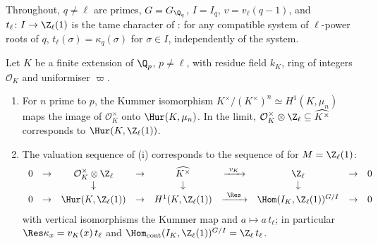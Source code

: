 Throughout, $q\ne\ell$ are primes, $G=G_{\Q_q}$, $I=I_q$, $v=v_\ell(q-1)$, and $t_\ell\colon I\to\Z_\ell(1)$ is the tame character of : for any compatible
system of $\ell$-power roots of $q$, $t_\ell(\sigma)=\kappa_q(\sigma)$ for $\sigma\in I$, independently of the system.

\begin{proposition}\label{prop:galcoh:unit-classes}
Let $K$ be a finite extension of $\Q_p$, $p\ne\ell$, with residue field $k_K$, ring of integers $\mathcal O_K$ and uniformiser $\varpi$.
\begin{enumerate}[label=(\roman*)]
\item For $n$ prime to $p$, the Kummer isomorphism $K^\times/(K^\times)^n\simeq H^1(K,\mu_n)$ maps the image of $\mathcal O_K^\times$ onto $\Hur(K,\mu_n)$. In the limit,
$\mathcal O_K^\times\otimes\Z_\ell\subseteq\widehat{K^\times}$ corresponds to $\Hur(K,\Z_\ell(1))$.
\item The valuation sequence of (i) corresponds to the sequence of  for $M=\Z_\ell(1)$:
\[
\begin{array}{ccccccccc}
0&\to&\mathcal O_K^\times\otimes\Z_\ell&\to&\widehat{K^\times}&\xrightarrow{\ v_K\ }&\Z_\ell&\to&0\\
&&\downarrow&&\downarrow&&\downarrow&&\\
0&\to&\Hur(K,\Z_\ell(1))&\to&H^1(K,\Z_\ell(1))&\xrightarrow{\ \Res\ }&\Hom(I_K,\Z_\ell(1))^{G/I}&\to&0
\end{array}
\]
with vertical isomorphisms the Kummer map and $a\mapsto a\,t_\ell$; in particular $\Res\kappa_x=v_K(x)\,t_\ell$ and $\Hom_{\mathrm{cont}}(I_K,\Z_\ell(1))^{G/I}=\Z_\ell\,t_\ell$.
\end{enumerate}
\end{proposition}


